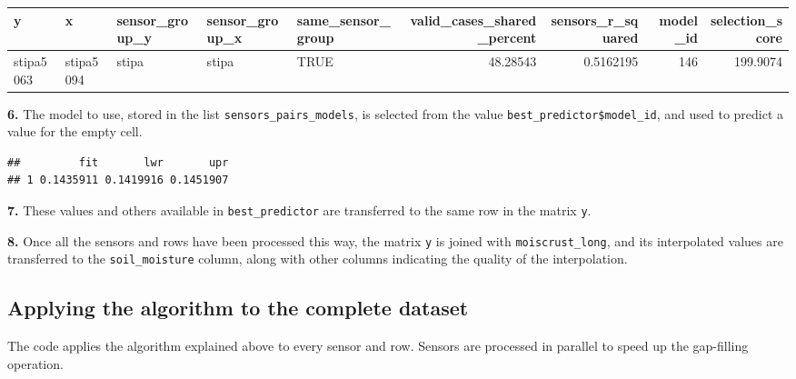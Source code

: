 \documentclass[]{article}
\newenvironment{Shaded}{\begin{snugshade}}{\end{snugshade}}
\newcommand{\DataTypeTok}[1]{\textcolor[rgb]{0.13,0.29,0.53}{#1}}
\newcommand{\KeywordTok}[1]{\textcolor[rgb]{0.13,0.29,0.53}{\textbf{#1}}}
\newcommand{\NormalTok}[1]{#1}
\newcommand{\OperatorTok}[1]{\textcolor[rgb]{0.81,0.36,0.00}{\textbf{#1}}}
\newcommand{\OtherTok}[1]{\textcolor[rgb]{0.56,0.35,0.01}{#1}}
\newcommand{\StringTok}[1]{\textcolor[rgb]{0.31,0.60,0.02}{#1}}
\begin{document}
\begin{tabular}[t]{l|l|l|l|l|r|r|r|r}
\hline
y & x & sensor\_group\_y & sensor\_group\_x & same\_sensor\_group & valid\_cases\_shared\_percent & sensors\_r\_squared & model\_id & selection\_score\\
\hline
stipa5063 & stipa5094 & stipa & stipa & TRUE & 48.28543 & 0.5162195 & 146 & 199.9074\\
\hline
\end{tabular}

\textbf{6.} The model to use, stored in the list
\texttt{sensors\_pairs\_models}, is selected from the value
\texttt{best\_predictor\$model\_id}, and used to predict a value for the
empty cell.

\begin{Shaded}
\end{Shaded}

\begin{verbatim}
##         fit       lwr       upr
## 1 0.1435911 0.1419916 0.1451907
\end{verbatim}

\textbf{7.} These values and others available in
\texttt{best\_predictor} are transferred to the same row in the matrix
\texttt{y}.

\textbf{8.} Once all the sensors and rows have been processed this way,
the matrix \texttt{y} is joined with \texttt{moiscrust\_long}, and its
interpolated values are transferred to the \texttt{soil\_moisture}
column, along with other columns indicating the quality of the
interpolation.

\hypertarget{applying-the-algorithm-to-the-complete-dataset}{%
\subsection{Applying the algorithm to the complete
dataset}\label{applying-the-algorithm-to-the-complete-dataset}}

The code applies the algorithm explained above to every sensor and row.
Sensors are processed in parallel to speed up the gap-filling operation.
\end{document}
